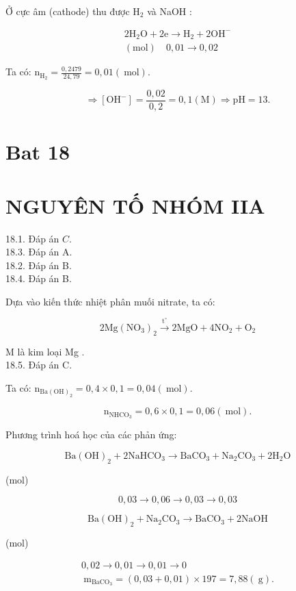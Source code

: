 \documentclass[10pt]{article}
\begin{document}
Ở cực âm (cathode) thu được $\mathrm{H}_{2}$ và NaOH :

$$
\begin{array}{lr}
2 \mathrm{H}_{2} \mathrm{O}+2 \mathrm{e} \rightarrow \mathrm{H}_{2}+2 \mathrm{OH}^{-} \\
(\mathrm{mol}) \quad 0,01 \rightarrow 0,02
\end{array}
$$

Ta có: $\mathrm{n}_{\mathrm{H}_{2}}=\frac{0,2479}{24,79}=0,01(\mathrm{~mol})$.

$$
\Rightarrow\left[\mathrm{OH}^{-}\right]=\frac{0,02}{0,2}=0,1(\mathrm{M}) \Rightarrow \mathrm{pH}=13 .
$$

\section*{Bat 18}
\section*{NGUYÊN TỐ NHÓM IIA}
18.1. Đáp án $C$.\\
18.3. Đáp án A.\\
18.2. Đáp án B.\\
18.4. Đáp án B.

Dựa vào kiến thức nhiệt phân muối nitrate, ta có:

$$
2 \mathrm{Mg}\left(\mathrm{NO}_{3}\right)_{2} \xrightarrow{\mathrm{t}^{\circ}} 2 \mathrm{MgO}+4 \mathrm{NO}_{2}+\mathrm{O}_{2}
$$

M là kim loại Mg .\\
18.5. Đáp án C.

Ta có: $\mathrm{n}_{\mathrm{Ba}(\mathrm{OH})_{2}}=0,4 \times 0,1=0,04(\mathrm{~mol})$.

$$
\mathrm{n}_{\mathrm{NHCO}_{3}}=0,6 \times 0,1=0,06(\mathrm{~mol}) .
$$

Phương trình hoá học của các phản ứng:

$$
\mathrm{Ba}(\mathrm{OH})_{2}+2 \mathrm{NaHCO}_{3} \rightarrow \mathrm{BaCO}_{3}+\mathrm{Na}_{2} \mathrm{CO}_{3}+2 \mathrm{H}_{2} \mathrm{O}
$$

(mol)

$$
0,03 \rightarrow 0,06 \rightarrow 0,03 \rightarrow 0,03
$$

$$
\mathrm{Ba}(\mathrm{OH})_{2}+\mathrm{Na}_{2} \mathrm{CO}_{3} \rightarrow \mathrm{BaCO}_{3}+2 \mathrm{NaOH}
$$

(mol)

$$
\begin{gathered}
0,02 \rightarrow 0,01 \rightarrow 0,01 \rightarrow 0 \\
\mathrm{~m}_{\mathrm{BaCO}_{3}}=(0,03+0,01) \times 197=7,88(\mathrm{~g}) .
\end{gathered}
$$
\end{document}
